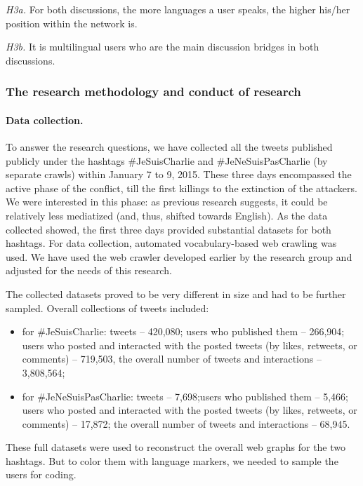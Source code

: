 \textit{H3a.} For both discussions, the more languages a user speaks, the higher his/her position within the network is.

\textit{H3b.} It is multilingual users who are the main discussion bridges in both discussions.

\subsubsection{The research methodology and conduct of research}

\paragraph{Data collection.} To answer the research questions, we have collected all the tweets published publicly under the hashtags \#JeSuisCharlie and \#JeNeSuisPasCharlie (by separate crawls) within January 7 to 9, 2015. These three days encompassed the active phase of the conflict, till the first killings to the extinction of the attackers. We were interested in this phase: as previous research suggests, it could be relatively less mediatized (and, thus, shifted towards English). As the data collected showed, the first three days provided substantial datasets for both hashtags. For data collection, automated vocabulary-based web crawling was used. We have used the web crawler developed earlier by the research group \cite{BlekanovSergeevMartynenko} and adjusted for the needs of this research.

The collected datasets proved to be very different in size and had to be further sampled. Overall collections of tweets included:

\begin{itemize}
	\item for \#JeSuisCharlie: tweets -- 420,080; users who published them -- 266,904; users who posted and interacted with the posted tweets (by likes, retweets, or comments) -- 719,503, the overall number of tweets and interactions -- 3,808,564;
	\item for \#JeNeSuisPasCharlie: tweets -- 7,698;users who published them -- 5,466; users who posted and interacted with the posted tweets (by likes, retweets, or comments) -- 17,872; the overall number of tweets and interactions -- 68,945.
\end{itemize}

These full datasets were used to reconstruct the overall web graphs for the two hashtags. But to color them with language markers, we needed to sample the users for coding.

